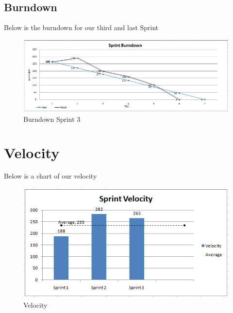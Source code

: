 \subsection{Burndown}
Below is the burndown for our third and last Sprint
\begin{figure}[h]
\begin{center}
\includegraphics[scale=0.7]{img/SCRUM/burndownSprint3.png}
\caption{Burndown Sprint 3}
\label{fig:Burndown Sprint 3}
\end{center}
\end{figure}



\section{Velocity}
Below is a chart of our velocity


\begin{figure}[h]
\begin{center}
\includegraphics[scale=0.7]{img/SCRUM/overallVelocity.png}
\caption{Velocity}
\label{fig:Velocity}
\end{center}
\end{figure}



\newpage
